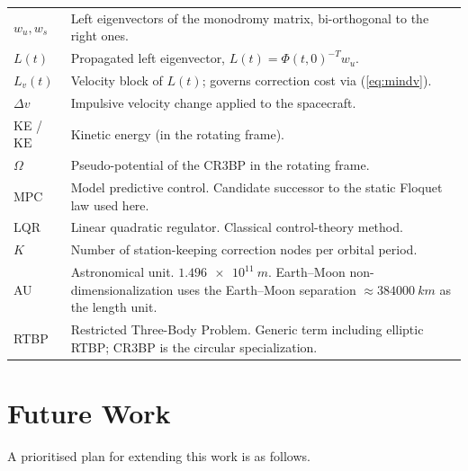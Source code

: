 \documentclass[11pt,a4paper]{article}
\begin{document}
\begin{longtable}{@{}l p{}@{}}
$w_u, w_s$ & Left eigenvectors of the monodromy matrix, bi-orthogonal to the right ones. \\
$L(t)$ & Propagated left eigenvector, $L(t) = \Phi(t,0)^{-T} w_u$. \\
$L_v(t)$ & Velocity block of $L(t)$; governs correction cost via (\ref{eq:mindv}). \\
$\Delta v$ & Impulsive velocity change applied to the spacecraft. \\
KE / $\mathrm{KE}$ & Kinetic energy (in the rotating frame). \\
$\Omega$ & Pseudo-potential of the CR3BP in the rotating frame. \\
MPC & Model predictive control. Candidate successor to the static Floquet law used here. \\
LQR & Linear quadratic regulator. Classical control-theory method. \\
$K$ & Number of station-keeping correction nodes per orbital period. \\
AU & Astronomical unit. $\SI{1.496e11}{m}$. Earth--Moon non-dimensionalization uses the Earth--Moon separation $\approx \SI{384000}{km}$ as the length unit. \\
RTBP & Restricted Three-Body Problem. Generic term including elliptic RTBP; CR3BP is the circular specialization. \\
\bottomrule
\end{longtable}

\section{Future Work}\label{sec:future}

A prioritised plan for extending this work is as follows.
\end{document}
